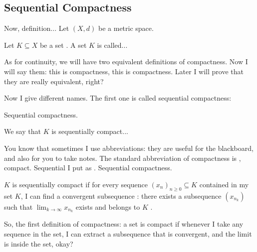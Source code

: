 \begin{hidden}
\end{hidden}

\subsection{Sequential Compactness}

\begin{speech}[00:52:52 - 00:53:52]
Now, definition...  Let $(X, d)$ be a metric space.

Let $K \subseteq X$ be a set . A set $K$ is called...

As for continuity, we will have two equivalent definitions of compactness. Now I will say them: this is compactness, this is compactness. Later I will prove that they are really equivalent, right?

Now I give different names. The first one is called sequential compactness:
\end{speech}

\begin{speech}[00:53:52 - 00:56:11]
 Sequential compactness.

We say that $K$ is sequentially compact... 

You know that sometimes I use abbreviations: they are useful for the blackboard, and also for you to take notes. The standard abbreviation of compactness is , compact. Sequential I put as . Sequential compactness.

$K$ is sequentially compact if for every sequence $(x_n)_{n \ge 0} \subseteq K$  contained in my set $K$, I can find a convergent subsequence : there exists a subsequence $(x_{n_k})$ such that $\lim_{k \to \infty} x_{n_k}$  exists  and belongs to $K$ .

So, the first definition of compactness: a set is compact if whenever I take any sequence in the set, I can extract a subsequence that is convergent, and the limit is inside the set, okay?
\end{speech}

